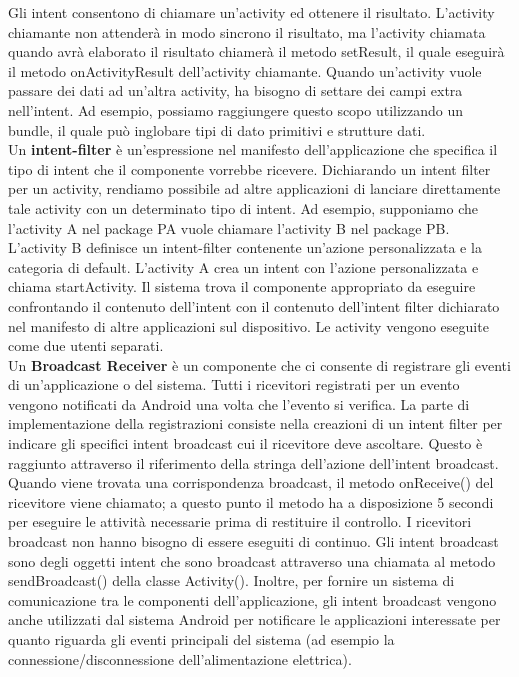 \documentclass[12pt]{report}
\begin{document}
Gli intent consentono di chiamare un'activity ed ottenere il risultato. L'activity chiamante non attenderà in modo sincrono il risultato, ma l'activity chiamata quando avrà elaborato il risultato chiamerà il metodo setResult, il quale eseguirà il metodo onActivityResult dell'activity chiamante. Quando un'activity vuole passare dei dati ad un'altra activity, ha bisogno di settare dei campi extra nell'intent. Ad esempio, possiamo raggiungere questo scopo utilizzando un bundle, il quale può inglobare tipi di dato primitivi e strutture dati. \\Un \textbf{intent-filter} è un'espressione nel manifesto dell'applicazione che specifica il tipo di intent che il componente vorrebbe ricevere. Dichiarando un intent filter per un activity, rendiamo possibile ad altre applicazioni di lanciare direttamente tale activity con un determinato tipo di intent. Ad esempio, supponiamo che l'activity A nel package PA vuole chiamare l'activity B nel package PB. L'activity B definisce un intent-filter contenente un'azione personalizzata e la categoria di default. L'activity A crea un intent con l'azione personalizzata e chiama startActivity. Il sistema trova il componente appropriato da eseguire confrontando il contenuto dell'intent con il contenuto dell'intent filter dichiarato nel manifesto di altre applicazioni sul dispositivo. Le activity vengono eseguite come due utenti separati.\\Un \textbf{Broadcast Receiver} è un componente che ci consente di registrare gli eventi di un'applicazione o del sistema. Tutti i ricevitori registrati per un evento vengono notificati da Android una volta che l'evento si verifica. La parte di implementazione della registrazioni consiste nella creazioni di un intent filter per indicare gli specifici intent broadcast cui il ricevitore deve ascoltare. Questo è raggiunto attraverso il riferimento della stringa dell'azione dell'intent broadcast. Quando viene trovata una corrispondenza broadcast, il metodo onReceive() del ricevitore viene chiamato; a questo punto il metodo ha a disposizione 5 secondi per eseguire le attività necessarie prima di restituire il controllo. I ricevitori broadcast non hanno bisogno di essere eseguiti di continuo. Gli intent broadcast sono degli oggetti intent che sono broadcast attraverso una chiamata al metodo sendBroadcast() della classe Activity(). Inoltre, per fornire un sistema di comunicazione tra le componenti dell'applicazione, gli intent broadcast vengono anche utilizzati dal sistema Android per notificare le applicazioni interessate per quanto riguarda gli eventi principali del sistema (ad esempio la connessione/disconnessione dell'alimentazione elettrica).
\end{document}
